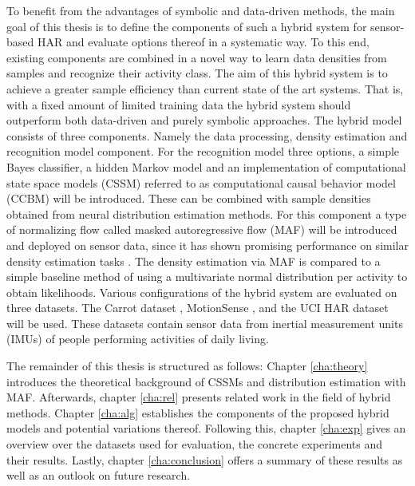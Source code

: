 \documentclass[11pt,titlepage,oneside,openany]{book}
\begin{document}
To benefit from the advantages of symbolic and data-driven methods, the main goal of this thesis is to define the components of such a hybrid system for sensor-based HAR and evaluate options thereof in a systematic way. To this end, existing components are combined in a novel way to learn data densities from samples and recognize their activity class. The aim of this hybrid system is to achieve a greater sample efficiency than current state of the art systems. That is, with a fixed amount of limited training data the hybrid system should outperform both data-driven and purely symbolic approaches. The hybrid model consists of three components. Namely the data processing, density estimation and recognition model component. For the recognition model three options, a simple Bayes classifier, a hidden Markov model and an implementation of computational state space models (CSSM) \cite{kruger_computational_2014} referred to as computational causal behavior model (CCBM) will be introduced. These can be combined with sample densities obtained from neural distribution estimation methods. For this component a type of normalizing flow called masked autoregressive flow (MAF) \cite{papamakarios_masked_2017} will be introduced and deployed on sensor data, since it has shown promising performance on similar density estimation tasks \cite{kobyzev_normalizing_2021}. The density estimation via MAF is compared to a simple baseline method of using a multivariate normal distribution per activity to obtain likelihoods. Various configurations of the hybrid system are evaluated on three datasets. The Carrot dataset \cite{kruger_recognising_2011}, MotionSense \cite{malekzadeh_mobile_2019}, and the UCI HAR dataset \cite{anguita_public_2013} will be used. These datasets contain sensor data from inertial measurement units (IMUs) of people performing activities of daily living.

The remainder of this thesis is structured as follows: Chapter \ref{cha:theory} introduces the theoretical background of CSSMs and distribution estimation with MAF. Afterwards, chapter \ref{cha:rel} presents related work in the field of hybrid methods. Chapter \ref{cha:alg} establishes the components of the proposed hybrid models and potential variations thereof. Following this, chapter \ref{cha:exp} gives an overview over the datasets used for evaluation, the concrete experiments and their results. Lastly, chapter \ref{cha:conclusion} offers a summary of these results as well as an outlook on future research.

\end{document}
